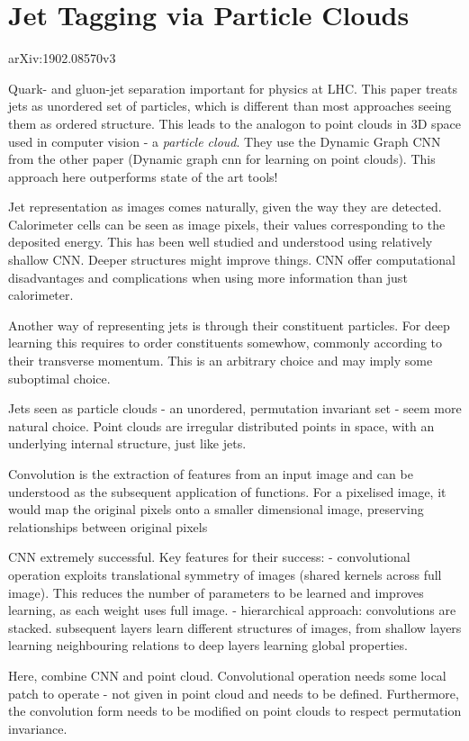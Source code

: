 \section{Jet Tagging via Particle Clouds}
arXiv:1902.08570v3

Quark- and gluon-jet separation important for physics at LHC. This paper treats
jets as unordered set of particles, which is different than most approaches
seeing them as ordered structure. This leads to the analogon to point clouds in
3D space used in computer vision - a \emph{particle cloud}. They use the Dynamic
Graph CNN from the other paper (Dynamic graph cnn for learning on
point clouds).  This approach here outperforms state of the art tools!

Jet representation as images comes naturally, given the way they are detected.
Calorimeter cells can be seen as image pixels, their values corresponding to the
deposited energy. This has been well studied and understood using relatively
shallow CNN. Deeper structures might improve things. CNN offer computational
disadvantages and complications when using more information than just
calorimeter.

Another way of representing jets is through their constituent particles. For
deep learning this
requires to order constituents somewhow, commonly according to their transverse
momentum. This is an arbitrary choice and may imply some suboptimal choice.

Jets seen as particle clouds - an unordered, permutation invariant set -  seem
more natural choice. Point clouds are irregular distributed points in space,
with an underlying internal structure, just like jets. 

Convolution is the extraction of features from an input image and can be
understood as the subsequent application of functions. For a pixelised image, it
would map the original pixels onto a smaller dimensional image, preserving
relationships between original pixels 

CNN extremely successful. Key features for their success: 
- convolutional operation exploits translational symmetry of images (shared
kernels across full image). This reduces the number of parameters to be learned
and improves learning, as each weight uses full image. 
- hierarchical approach: convolutions are stacked. subsequent layers learn
different structures of images, from shallow layers learning neighbouring
relations to deep layers learning global properties. 

Here, combine CNN and point cloud. Convolutional operation needs some local
patch to operate - not given in point cloud and needs to be defined.
Furthermore, the convolution form needs to be modified on point clouds to
respect permutation invariance.

